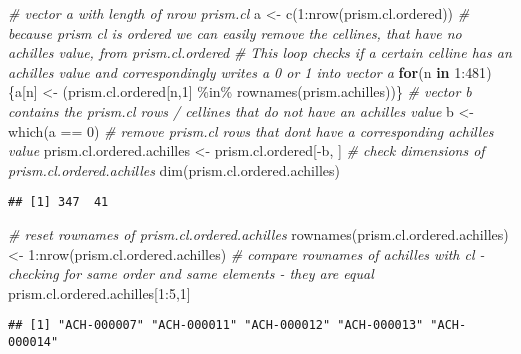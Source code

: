 \documentclass[
]{article}
\newenvironment{Shaded}{\begin{snugshade}}{\end{snugshade}}
\newcommand{\CommentTok}[1]{\textcolor[rgb]{0.56,0.35,0.01}{\textit{#1}}}
\newcommand{\ControlFlowTok}[1]{\textcolor[rgb]{0.13,0.29,0.53}{\textbf{#1}}}
\newcommand{\DecValTok}[1]{\textcolor[rgb]{0.00,0.00,0.81}{#1}}
\newcommand{\FunctionTok}[1]{\textcolor[rgb]{0.00,0.00,0.00}{#1}}
\newcommand{\NormalTok}[1]{#1}
\newcommand{\OtherTok}[1]{\textcolor[rgb]{0.56,0.35,0.01}{#1}}
\newcommand{\SpecialCharTok}[1]{\textcolor[rgb]{0.00,0.00,0.00}{#1}}
\begin{document}
\begin{Shaded}
\begin{Highlighting}[]
\CommentTok{\# vector a with length of nrow prism.cl}
\NormalTok{a }\OtherTok{\textless{}{-}} \FunctionTok{c}\NormalTok{(}\DecValTok{1}\SpecialCharTok{:}\FunctionTok{nrow}\NormalTok{(prism.cl.ordered))}
\CommentTok{\# because prism cl is ordered we can easily remove the cellines, that have no achilles value, from prism.cl.ordered}
\CommentTok{\# This loop checks if a certain celline has an achilles value and correspondingly writes a 0 or 1 into vector a}
\ControlFlowTok{for}\NormalTok{(n }\ControlFlowTok{in} \DecValTok{1}\SpecialCharTok{:}\DecValTok{481}\NormalTok{) \{a[n] }\OtherTok{\textless{}{-}}\NormalTok{ (prism.cl.ordered[n,}\DecValTok{1}\NormalTok{] }\SpecialCharTok{\%in\%} \FunctionTok{rownames}\NormalTok{(prism.achilles))\}}
\CommentTok{\# vector b contains the prism.cl rows / cellines that do not have an achilles value}
\NormalTok{b }\OtherTok{\textless{}{-}} \FunctionTok{which}\NormalTok{(a }\SpecialCharTok{==} \DecValTok{0}\NormalTok{)}
\CommentTok{\# remove prism.cl rows that don\textquotesingle{}t have a corresponding achilles value}
\NormalTok{prism.cl.ordered.achilles }\OtherTok{\textless{}{-}}\NormalTok{ prism.cl.ordered[}\SpecialCharTok{{-}}\NormalTok{b, ]}
\CommentTok{\# check dimensions of prism.cl.ordered.achilles}
\FunctionTok{dim}\NormalTok{(prism.cl.ordered.achilles)}
\end{Highlighting}
\end{Shaded}

\begin{verbatim}
## [1] 347  41
\end{verbatim}

\begin{Shaded}
\begin{Highlighting}[]
\CommentTok{\# reset rownames of prism.cl.ordered.achilles}
\FunctionTok{rownames}\NormalTok{(prism.cl.ordered.achilles) }\OtherTok{\textless{}{-}} \DecValTok{1}\SpecialCharTok{:}\FunctionTok{nrow}\NormalTok{(prism.cl.ordered.achilles)}
\CommentTok{\# compare rownames of achilles with cl {-} checking for same order and same elements {-} they are equal}
\NormalTok{prism.cl.ordered.achilles[}\DecValTok{1}\SpecialCharTok{:}\DecValTok{5}\NormalTok{,}\DecValTok{1}\NormalTok{]}
\end{Highlighting}
\end{Shaded}

\begin{verbatim}
## [1] "ACH-000007" "ACH-000011" "ACH-000012" "ACH-000013" "ACH-000014"
\end{verbatim}
\end{document}
